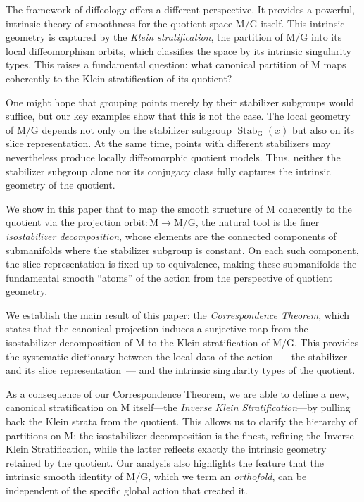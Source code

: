 \documentclass[10pt,reqno,letterpaper,twoside]{amsart}
\theoremstyle{article}
\def \G{\mathrm G}
\def \M{\mathrm M}
\DeclareMathOperator{\Stab}{Stab}
\newcommand{\orbit}{{\mathrm{orbit}}}
\begin{document}
  The framework of diffeology offers a different perspective.
  It provides a powerful,
  intrinsic theory of smoothness for the quotient space $\M/\G$ itself.
  This intrinsic geometry is captured by the \emph{Klein stratification},
  the partition of $\M/\G$ into its local diffeomorphism orbits,
  which classifies the space by its intrinsic singularity types.
  This raises a fundamental question:
  what canonical partition of $\M$ maps coherently to the Klein stratification of its quotient?
  
  One might hope that grouping points merely by their stabilizer subgroups would suffice,
  but our key examples show that this is not the case.
  The local geometry of $\M/\G$ depends not only on the stabilizer subgroup $\Stab_\G(x)$
  but also on its slice representation.
  At the same time,
  points with different stabilizers may nevertheless produce locally diffeomorphic quotient models.
  Thus,
  neither the stabilizer subgroup alone nor its conjugacy class fully captures the intrinsic geometry of the quotient.
    
  We show in this paper that to map the smooth structure of $\M$ coherently to the quotient via the projection $\orbit : \M \to \M/\G$,
  the natural tool is the finer \emph{isostabilizer decomposition},
  whose elements are the connected components of submanifolds where the stabilizer subgroup is constant.
  On each such component,
  the slice representation is fixed up to equivalence,
  making these submanifolds the fundamental smooth ``atoms'' of the action from the perspective of quotient geometry.
  
  We establish the main result of this paper:
  the \emph{Correspondence Theorem},
  which states that the canonical projection induces a surjective map from the isostabilizer decomposition of $\M$ to the Klein stratification of $\M/\G$.
  This provides the systematic dictionary between the local data of the action
  ---~the stabilizer and its slice representation~---
  and the intrinsic singularity types of the quotient.
  
  As a consequence of our Correspondence Theorem,
  we are able to define a new,
  canonical stratification on $\M$ itself—the \emph{Inverse Klein Stratification}—by pulling back the Klein strata from the quotient.
  This allows us to clarify the hierarchy of partitions on $\M$:
  the isostabilizer decomposition is the finest,
  refining the Inverse Klein Stratification,
  while the latter reflects exactly the intrinsic geometry retained by the quotient.
  Our analysis also highlights the feature that the intrinsic smooth identity of $\M/\G$,
  which we term an \emph{orthofold},
  can be independent of the specific global action that created it.
  
\end{document}
